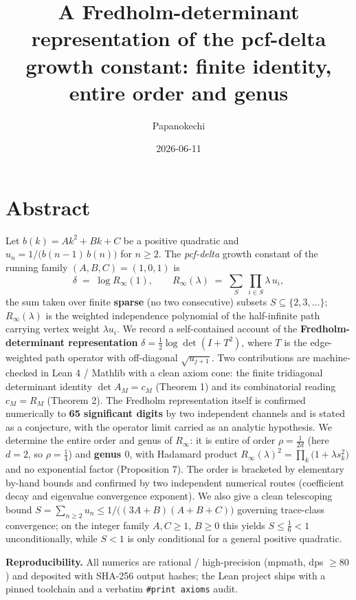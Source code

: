 \documentclass[
]{article}
\title{A Fredholm-determinant representation of the pcf-delta growth
constant: finite identity, entire order and genus}
\author{Papanokechi}
\date{2026-06-11}
\theoremstyle{plain}
\theoremstyle{remark}
\begin{document}
\maketitle

\section*{Abstract}\label{abstract}

Let \(b(k)=Ak^2+Bk+C\) be a positive quadratic and
\(u_n = 1/\bigl(b(n-1)\,b(n)\bigr)\) for \(n\ge 2\). The
\emph{pcf-delta} growth constant of the running family
\((A,B,C)=(1,0,1)\) is \[
\delta \;=\; \log R_\infty(1),\qquad
R_\infty(\lambda)\;=\;\sum_{S}\ \prod_{i\in S}\lambda\,u_i ,
\] the sum taken over finite \textbf{sparse} (no two consecutive)
subsets \(S\subseteq\{2,3,\dots\}\); \(R_\infty(\lambda)\) is the
weighted independence polynomial of the half-infinite path carrying
vertex weight \(\lambda u_i\). We record a self-contained account of the
\textbf{Fredholm-determinant representation}
\(\delta=\tfrac12\log\det(I+T^2)\), where \(T\) is the edge-weighted
path operator with off-diagonal \(\sqrt{u_{j+1}}\). Two contributions
are machine-checked in Lean 4 / Mathlib with a clean axiom cone: the
finite tridiagonal determinant identity \(\det A_M = c_M\) (Theorem 1)
and its combinatorial reading \(c_M = R_M\) (Theorem 2). The Fredholm
representation itself is confirmed numerically to \textbf{65 significant
digits} by two independent channels and is stated as a conjecture, with
the operator limit carried as an analytic hypothesis. We determine the
entire order and genus of \(R_\infty\): it is entire of order
\(\rho=\tfrac1{2d}\) (here \(d=2\), so \(\rho=\tfrac14\)) and
\textbf{genus \(0\)}, with Hadamard product
\(R_\infty(\lambda)^2=\prod_k\bigl(1+\lambda s_k^2\bigr)\) and no
exponential factor (Proposition 7). The order is bracketed by elementary
by-hand bounds and confirmed by two independent numerical routes
(coefficient decay and eigenvalue convergence exponent). We also give a
clean telescoping bound
\(S=\sum_{n\ge2}u_n\le 1/\bigl((3A+B)(A+B+C)\bigr)\) governing
trace-class convergence; on the integer family \(A,C\ge1\), \(B\ge0\)
this yields \(S\le\tfrac16<1\) unconditionally, while \(S<1\) is only
conditional for a general positive quadratic.

\textbf{Reproducibility.} All numerics are rational / high-precision
(mpmath, dps \(\ge 80\)) and deposited with SHA-256 output hashes; the
Lean project ships with a pinned toolchain and a verbatim
\texttt{\#print\ axioms} audit.
\end{document}
